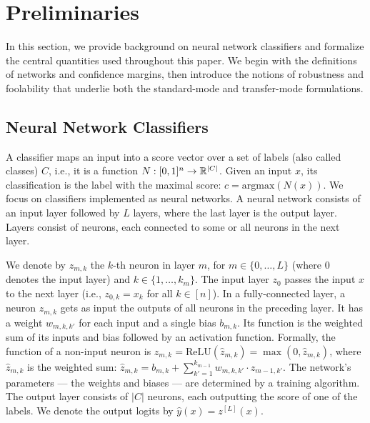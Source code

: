 \section{Preliminaries}
\label{sec:notation}

In this section, we provide background on neural network classifiers and formalize the central quantities used throughout this paper. We begin with the definitions of networks and confidence margins, then introduce the notions of robustness and foolability that underlie both the standard-mode and transfer-mode formulations.

\subsection{Neural Network Classifiers}

A classifier maps an input into a score vector over a set of labels (also called classes) $C$, i.e., it is a function $N : [0,1]^n \to \mathbb{R}^{|C|}$. Given an input $x$, its classification is the label with the maximal score: $c = \mathrm{argmax}(N(x))$. We focus on classifiers implemented as neural networks. A neural network consists of an input layer followed by $L$ layers, where the last layer is the output layer. Layers consist of neurons, each connected to some or all neurons in the next layer.

We denote by $z_{m,k}$ the $k$-th neuron in layer $m$, for $m \in \{0, \ldots, L\}$ (where $0$ denotes the input layer) and $k \in \{1, \ldots, k_m\}$. The input layer $z_0$ passes the input $x$ to the next layer (i.e., $z_{0,k} = x_k$ for all $k \in [n]$). In a fully-connected layer, a neuron $z_{m,k}$ gets as input the outputs of all neurons in the preceding layer. It has a weight $w_{m,k,k'}$ for each input and a single bias $b_{m,k}$. Its function is the weighted sum of its inputs and bias followed by an activation function. Formally, the function of a non-input neuron is $z_{m,k} = \mathrm{ReLU}(\hat{z}_{m,k}) = \max(0, \hat{z}_{m,k})$, where $\hat{z}_{m,k}$ is the weighted sum: $\hat{z}_{m,k} = b_{m,k} + \sum_{k'=1}^{k_{m-1}} w_{m,k,k'} \cdot z_{m-1,k'}$. The network's parameters --- the weights and biases --- are determined by a training algorithm. The output layer consists of $|C|$ neurons, each outputting the score of one of the labels. We denote the output logits by $\hat{y}(x) = z^{[L]}(x)$.

